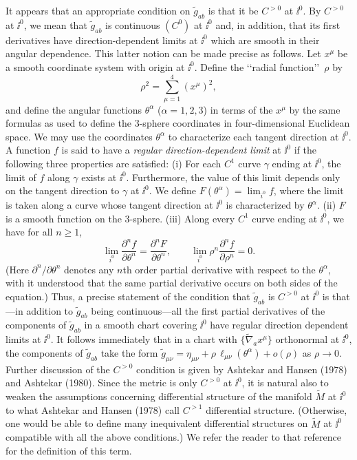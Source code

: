 It appears that an appropriate condition on \(\tilde g_{ab}\) is that it be \(C^{>0}\) at
\(\ii^0\). By \(C^{>0}\) at \(\ii^0\), we mean that \(\tilde g_{ab}\) is continuous
\((C^0)\) at \(\ii^0\) and, in addition, that its first derivatives have direction-dependent
limits at \(\ii^0\) which are smooth in their angular dependence. This latter notion can
be made precise as follows. Let \(x^\mu\) be a smooth coordinate system with origin
at \(\ii^0\). Define the \lq\lq radial function\rq\rq\ \(\rho\) by
\begin{equation*}
  \rho^2=\sum_{\mu=1}^{4}(x^\mu)^2,
\end{equation*}
and define the angular functions \(\theta^\alpha\) (\(\alpha=1,2,3\)) in terms of
the \(x^\mu\) by the same formulas as used to define the 3-sphere coordinates in
four-dimensional Euclidean space. We may use the coordinates \(\theta^\alpha\) to
characterize each tangent direction at \(\ii^0\). A function \(f\) is said to have a
\emph{regular direction-dependent limit} at \(\ii^0\) if the following three properties
are satisfied: (i) For each \(C^1\) curve \(\gamma\) ending at \(\ii^0\), the limit of
\(f\) along \(\gamma\) exists at \(\ii^0\). Furthermore, the value of this limit depends
only on the tangent direction to \(\gamma\) at \(\ii^0\). We define
\(F(\theta^\alpha)=\lim_{i^0}f\), where the limit is taken along a curve whose
tangent direction at \(\ii^0\) is characterized by \(\theta^\alpha\). (ii) \(F\) is a
smooth function on the 3-sphere. (iii) Along every \(C^1\) curve ending at \(\ii^0\),
we have for all \(n\geq1\),
\begin{equation*}
  \lim_{i^0}\frac{\partial^n f}{\partial\theta^n}
  =\frac{\partial^nF}{\partial\theta^n},
  \qquad
  \lim_{i^0}\rho^n\frac{\partial^nf}{\partial\rho^n}=0.
\end{equation*}
(Here \(\partial^n/\partial\theta^n\) denotes any \(n\)th order partial derivative
with respect to the \(\theta^\alpha\), with it understood that the same partial
derivative occurs on both sides of the equation.) Thus, a precise statement of the
condition that \(\tilde g_{ab}\) is \(C^{>0}\) at \(\ii^0\) is that---in addition to
\(\tilde g_{ab}\) being continuous---all the first partial derivatives of the components
of \(\tilde g_{ab}\) in a smooth chart covering \(\ii^0\) have regular direction
dependent limits at \(\ii^0\). It follows immediately that in a chart with
\(\{\tilde\nabla_ax^\mu\}\) orthonormal at \(\ii^0\), the components of
\(\tilde g_{ab}\) take the form
\(\tilde g_{\mu\nu}=\eta_{\mu\nu}+\rho\,\ell_{\mu\nu}(\theta^\alpha)+o(\rho)\)
as \(\rho\to0\). Further discussion of the \(C^{>0}\) condition is given by
Ashtekar and Hansen (1978) and Ashtekar (1980). Since the metric is only
\(C^{>0}\) at \(\ii^0\), it is natural also to weaken the assumptions concerning
differential structure of the manifold \(\tilde M\) at \(\ii^0\) to what Ashtekar and
Hansen (1978) call \(C^{>1}\) differential structure. (Otherwise, one would be able
to define many inequivalent differential structures on \(\tilde M\) at \(\ii^0\)
compatible with all the above conditions.) We refer the reader to that reference for
the definition of this term.

